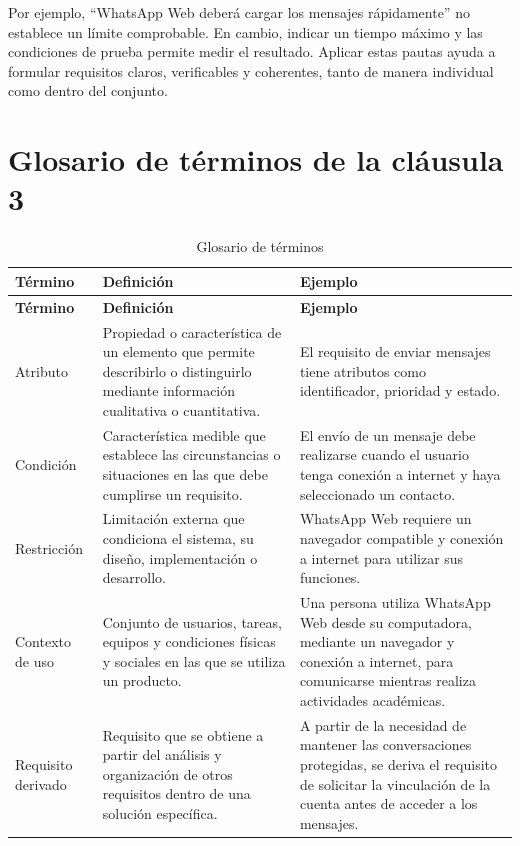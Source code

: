 \documentclass[12pt,a4paper,oneside]{article}
\begin{document}
Por ejemplo, ``WhatsApp Web deberá cargar los mensajes rápidamente'' no establece un límite comprobable. En cambio, indicar un tiempo máximo y las condiciones de prueba permite medir el resultado. Aplicar estas pautas ayuda a formular requisitos claros, verificables y coherentes, tanto de manera individual como dentro del conjunto.

\section{Glosario de términos de la cláusula 3}

\small
\begin{longtable}{L{3.0cm} L{5.2cm} L{5.2cm}}
\caption{Glosario de términos}\label{tab:glosario}\\

\toprule
\textbf{Término} &
\textbf{Definición} &
\textbf{Ejemplo} \\
\midrule
\endfirsthead

\toprule
\textbf{Término} &
\textbf{Definición} &
\textbf{Ejemplo} \\
\midrule
\endhead

\bottomrule
\endfoot

Atributo &
Propiedad o característica de un elemento que permite describirlo o distinguirlo mediante información cualitativa o cuantitativa. &
El requisito de enviar mensajes tiene atributos como identificador, prioridad y estado. \\

Condición &
Característica medible que establece las circunstancias o situaciones en las que debe cumplirse un requisito. &
El envío de un mensaje debe realizarse cuando el usuario tenga conexión a internet y haya seleccionado un contacto. \\

Restricción &
Limitación externa que condiciona el sistema, su diseño, implementación o desarrollo. &
WhatsApp Web requiere un navegador compatible y conexión a internet para utilizar sus funciones. \\

Contexto de uso &
Conjunto de usuarios, tareas, equipos y condiciones físicas y sociales en las que se utiliza un producto. &
Una persona utiliza WhatsApp Web desde su computadora, mediante un navegador y conexión a internet, para comunicarse mientras realiza actividades académicas. \\

Requisito derivado &
Requisito que se obtiene a partir del análisis y organización de otros requisitos dentro de una solución específica. &
A partir de la necesidad de mantener las conversaciones protegidas, se deriva el requisito de solicitar la vinculación de la cuenta antes de acceder a los mensajes. \\


\end{longtable}
\end{document}
